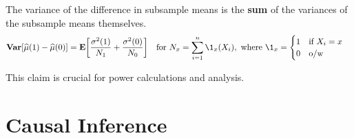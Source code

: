 \begin{clm}
	The variance of the difference in subsample means is the \textbf{sum} of the variances of the subsample means themselves. \[\V\qty[\hat\mu(1)-\hat\mu(0)]=\E\qty[\dfrac{\sigma^2(1)}{N_1}+\dfrac{\sigma^2(0)}{N_0}]\quad\text{for } N_x=\sum_{i=1}^n\1_x(X_i),\text{ where }\1_x=\begin{cases}1\quad\text{if } X_i=x\\0\quad\text{o/w}\end{cases}\]	
\end{clm}
\begin{rmk}
	This claim is crucial for power calculations and analysis.
\end{rmk}


\newpage
\section{Causal Inference}
